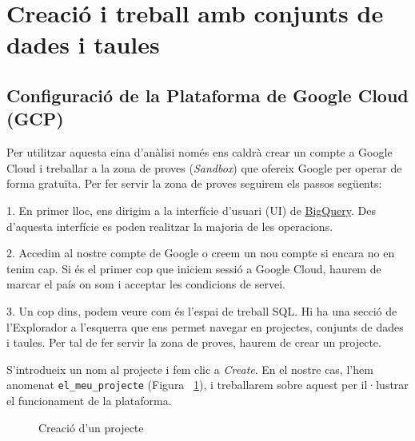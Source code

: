 \documentclass[11pt,longbibliography]{article}
\theoremstyle{definition}
\theoremstyle{remark}
\begin{document}
\pagebreak

\section{Creació i treball amb conjunts de dades i taules}

\subsection{Configuració de la Plataforma de Google Cloud (GCP)}

\graphicspath{ {BigQuery/Imatges tutorial/} }

Per utilitzar aquesta eina d’anàlisi només ens caldrà crear un compte a Google Cloud i treballar a la zona de proves (\textit{Sandbox}) que ofereix Google per operar de forma gratuïta.
Per fer servir la zona de proves seguirem els passos següents: 



1. En primer lloc, ens dirigim a la interfície d’usuari (UI) de \href{https://console.cloud.google.com}{BigQuery}. Des d'aquesta interfície es poden realitzar la majoria de les operacions.



2. Accedim al nostre compte de Google o creem un nou compte si encara no en tenim cap. Si és el primer cop que iniciem sessió a Google Cloud, haurem de marcar el país on som i acceptar les condicions de servei.



3. Un cop dins, podem veure com és l'espai de treball SQL. Hi ha una secció de l'Explorador a l'esquerra que ens permet navegar en projectes, conjunts de dades i taules. Per tal de fer servir la zona de proves, haurem de crear un projecte.

S'introdueix un nom al projecte i fem clic a \textit{Create}. En el nostre cas, l'hem anomenat \verb|el_meu_projecte| (Figura ~\ref{fig:bq1}), i treballarem sobre aquest per il·lustrar el funcionament de la plataforma.


\begin{figure}[h!]
\par
{}%
\hfill
{}%
\par
\caption{Creació d'un projecte}
\label{fig:bq1}
\end{figure}
\end{document}
